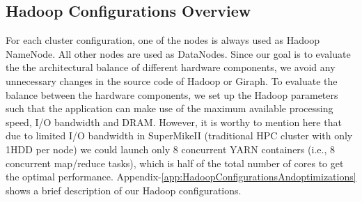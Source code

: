 \documentclass[journal]{IEEEtran}
\begin{document}
\subsection{Hadoop Configurations Overview}
For each cluster configuration, one of the nodes is always used as Hadoop NameNode. All other nodes are used as DataNodes. Since our goal is to evaluate the  the architectural balance of different hardware components, we avoid any unnecessary changes in the source code of Hadoop or Giraph. To evaluate the balance between the hardware components, we set up the Hadoop parameters such that the application can make use of the maximum available processing speed, I/O bandwidth and DRAM. However, it is worthy to mention here that due to limited I/O bandwidth in SuperMikeII (traditional HPC cluster with only 1HDD per node) we could launch only 8 concurrent YARN containers (i.e., 8 concurrent map/reduce tasks), which is half of the total number of cores to get the optimal performance. Appendix-\ref{app:HadoopConfigurationsAndoptimizations} shows a brief description of our Hadoop configurations.
\end{document}
